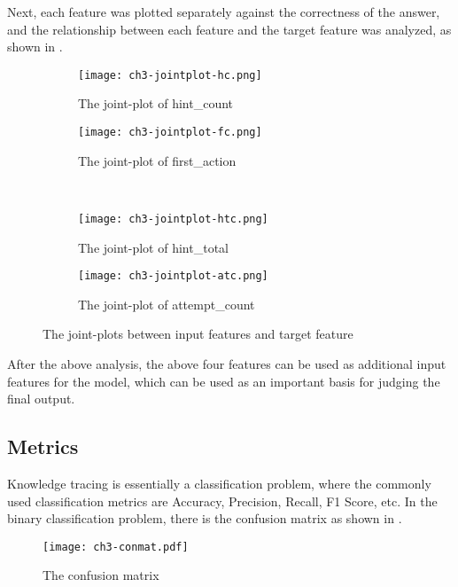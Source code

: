Next, each feature was plotted separately against the correctness of the answer, and the relationship between each feature and the target feature was analyzed, as shown in \figname{\ref{fig:ch3-jointplots}}.
\begin{figure}[htb]
    \centering
    \begin{subfigure}[b]{0.475\textwidth}
        \centering
        \texttt{[image: ch3-jointplot-hc.png]}
        \caption[dis]{The joint-plot of hint\_count}\label{fig:ch3-jointplot-hc}
    \end{subfigure}
    \begin{subfigure}[b]{0.475\textwidth}
        \centering
        \texttt{[image: ch3-jointplot-fc.png]}
        \caption{The joint-plot of first\_action}\label{fig:ch3-jointplot-fc}
    \end{subfigure}
    \\
    \begin{subfigure}[b]{0.475\textwidth}
        \centering
        \texttt{[image: ch3-jointplot-htc.png]}
        \caption[dis]{The joint-plot of hint\_total}\label{fig:ch3-jointplot-htc}
    \end{subfigure}
    \begin{subfigure}[b]{0.475\textwidth}
        \centering
        \texttt{[image: ch3-jointplot-atc.png]}
        \caption{The joint-plot of attempt\_count}\label{fig:ch3-jointplot-atc}
    \end{subfigure}
    \caption{The joint-plots between input features and target feature}\label{fig:ch3-jointplots}
\end{figure}

After the above analysis, the above four features can be used as additional input features for the model, which can be used as an important basis for judging the final output.
\subsection{Metrics}
Knowledge tracing is essentially a classification problem, where the commonly used classification metrics are Accuracy, Precision, Recall, F1 Score, etc. In the binary classification problem, there is the confusion matrix as shown in \figname{\ref{fig:ch3-conmat}}.
\begin{figure}[htbp!]
    \centering
    \texttt{[image: ch3-conmat.pdf]}
    \caption{The confusion matrix}\label{fig:ch3-conmat}
\end{figure}

